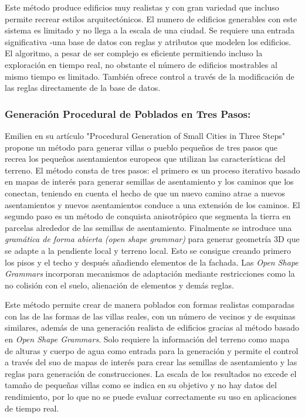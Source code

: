             Este método produce edificios muy realistas y con gran variedad que incluso permite recrear estilos arquitectónicos. El numero de edificios generables con este sistema es limitado y no llega a la escala de una ciudad. Se requiere una entrada significativa -una base de datos con reglas y atributos que modelen los edificios. El algoritmo, a pesar de ser complejo es eficiente permitiendo incluso la exploración en tiempo real, no obstante el número de edificios mostrables al mismo tiempo es limitado. También ofrece control a través de la modificación de las reglas directamente de la base de datos.

        \subsubsection{Generación Procedural de Poblados en Tres Pasos:} Emilien en su artículo "Procedural Generation of Small Cities in Three Steps" \cite{Emilien2012} propone un método para generar villas o pueblo pequeños de tres pasos que recrea los pequeños asentamientos europeos que utilizan las características del terreno. El método consta de tres pasos: el primero es un proceso iterativo basado en mapas de interés para generar semillas de asentamiento y los caminos que los conectan, teniendo en cuenta el hecho de que un nuevo camino atrae a nuevos asentamientos y nuevos asentamientos conduce a una extensión de los caminos. El segundo paso es un método de conquista anisotrópico que segmenta la tierra en parcelas alrededor de las semillas de asentamiento. Finalmente se introduce una \textit{gramática de forma abierta (open shape grammar)} para generar geometría 3D que se adapte a la pendiente local y terreno local. Esto se consigue creando primero los pisos y el techo y después añadiendo elementos de la fachada. Las \textit{Open Shape Grammars} incorporan mecanismos de adaptación mediante restricciones como la no colisión con el suelo, alienación de elementos y demás reglas. 
        
            Este método permite crear de manera poblados con formas realistas comparadas con las de las formas de las villas reales, con un número de vecinos y de esquinas similares, además de una generación realista de edificios gracias al método basado en \textit{Open Shape Grammars}. Solo requiere la información del terreno como mapa de alturas y cuerpo de agua como entrada para la generación y permite el control a través del suo de mapas de interés para crear las semillas de asentamiento y las reglas para generación de construcciones. La escala de los resultados no excede el tamaño de pequeñas villas como se indica en su objetivo y no hay datos del rendimiento, por lo que no se puede evaluar correctamente su uso en aplicaciones de tiempo real.
        

